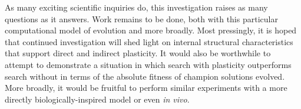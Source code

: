 As many exciting scientific inquiries do, this investigation raises as many questions as it answers.
Work remains to be done, both with this particular computational model of evolution and more broadly.
Most pressingly, it is hoped that continued investigation will shed light on internal structural characteristics that support direct and indirect plasticity.
It would also be worthwhile to attempt to demonstrate a situation in which search with plasticity outperforms search without in terms of the absolute fitness of champion solutions evolved.
More broadly, it would be fruitful to perform similar experiments with a more directly biologically-inspired model or even \textit{in vivo}.